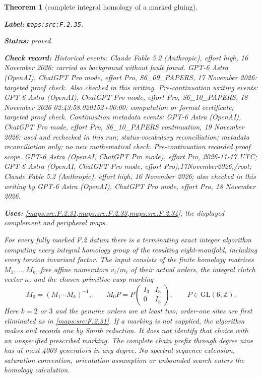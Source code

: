 \documentclass[11pt,a4paper]{article}
\newtheorem{theorem}{Theorem}[section]
\theoremstyle{definition}
\newcommand{\StatementRecord}[4]{\par\smallskip\begingroup\upshape\raggedright\noindent\textbf{Label:} \nolinkurl{#1}.\par\noindent\textbf{Status:} #2.\par\noindent\textbf{Check record:} #3.\par\noindent\textbf{Uses:} #4.\par\endgroup\smallskip}
\begin{document}
\begin{theorem}[complete integral homology of a marked gluing]\label{maps:src:F.2.35}
\StatementRecord{maps:src:F.2.35}{proved}{Historical events: Claude Fable 5.2 (Anthropic), effort high, 16 November 2026: carried as background without fault found. GPT-6 Astra (OpenAI), ChatGPT Pro mode, effort Pro, S6\_09\_PAPERS, 17 November 2026: targeted proof check. Also checked in this writing. Pre-continuation writing events: GPT-6 Astra (OpenAI), ChatGPT Pro mode, effort Pro, S6\_10\_PAPERS, 18 November 2026 02:43:58.020152+00:00: computation or formal certificate; targeted proof check. Continuation metadata events: GPT-6 Astra (OpenAI), ChatGPT Pro mode, effort Pro, S6\_10\_PAPERS continuation, 19 November 2026: used and rechecked in this run; status-vocabulary reconciliation; metadata reconciliation only; no new mathematical check. \emph{Pre-continuation recorded proof scope.} GPT-6 Astra (OpenAI, ChatGPT Pro mode), effort Pro, 2026-11-17 UTC; GPT-6 Astra (OpenAI, ChatGPT Pro mode, effort Pro),17November2026,/root; Claude Fable 5.2 (Anthropic), effort high, 16 November 2026; also checked in this writing by GPT-6 Astra (OpenAI), ChatGPT Pro mode, effort Pro, 18 November 2026}{\cref{maps:src:F.2.31,maps:src:F.2.33,maps:src:F.2.34}; the displayed complement and peripheral maps}


For every fully marked F.2 datum there is a terminating exact
integer algorithm computing every integral homology group of
the resulting eight-manifold, including every torsion invariant
factor.  The input consists of the finite homology matrices
$M_1,\ldots,M_k$, free affine numerators $v_i/m_i$ of their
actual orders, the integral clutch vector $\kappa$, and the
chosen primitive cusp marking
\[
 M_0=(M_1\cdots M_k)^{-1},\qquad
 M_0P=P\begin{pmatrix}I_3&I_3\\0&I_3\end{pmatrix},
 \qquad P\in\mathrm{GL}(6,\mathbb Z).                       \tag{F.GC1}\label{maps:eq:F.GC1}
\]
Here $k=2$ or $3$ and the genuine orders are at least two;
order-one sites are first eliminated as in \ref{maps:src:F.2.31}.
If a marking is not supplied, the algorithm makes and records
one by Smith reduction.  It does not identify that choice
with an unspecified prescribed marking.
The complete chain prefix through degree nine has at most
4003 generators in any degree.  No spectral-sequence
extension, saturation convention, orientation assumption or
unbounded search enters the homology calculation.

\end{theorem}
\end{document}
